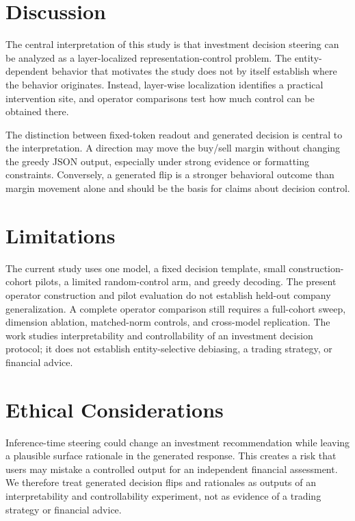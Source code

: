 \documentclass[11pt]{article}
\begin{document}
\section{Discussion}

The central interpretation of this study is that investment decision steering can be analyzed as a
layer-localized representation-control problem. The entity-dependent behavior that motivates the
study does not by itself establish where the behavior originates. Instead, layer-wise localization
identifies a practical intervention site, and operator comparisons test how much control can be
obtained there.

The distinction between fixed-token readout and generated decision is central to the interpretation.
A direction may move the buy/sell margin without changing the greedy JSON output, especially under
strong evidence or formatting constraints. Conversely, a generated flip is a stronger behavioral
outcome than margin movement alone and should be the basis for claims about decision control.

\section{Limitations}

The current study uses one model, a fixed decision template, small construction-cohort pilots, a
limited random-control arm, and greedy decoding. The present operator construction and pilot
evaluation do not establish held-out company generalization. A complete operator comparison still
requires a full-cohort sweep, dimension ablation, matched-norm controls, and cross-model replication.
The work studies interpretability and controllability of an investment decision protocol; it does not
establish entity-selective debiasing, a trading strategy, or financial advice.

\section{Ethical Considerations}

Inference-time steering could change an investment recommendation while leaving a plausible surface
rationale in the generated response. This creates a risk that users may mistake a controlled output
for an independent financial assessment. We therefore treat generated decision flips and rationales
as outputs of an interpretability and controllability experiment, not as evidence of a trading
strategy or financial advice.
\end{document}

